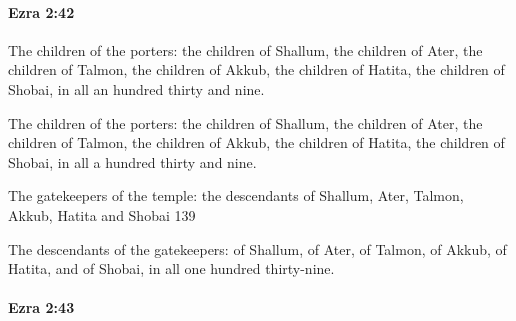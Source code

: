 		\paragraph{Ezra 2:42} %
			\label{EZRA-2-42}

			The children of the porters: the children of Shallum, the children of Ater, the children of Talmon, the children of Akkub, the children of Hatita, the children of Shobai, in all an hundred thirty and nine.

			\begin{versebox}
					\item[BHS] 
					\item[LXX] 
					\item[ASV] The children of the porters: the children of Shallum, the children of Ater, the children of Talmon, the children of Akkub, the children of Hatita, the children of Shobai, in all a hundred thirty and nine.
					\item[NIV] The gatekeepers of the temple: the descendants of Shallum, Ater, Talmon, Akkub, Hatita and Shobai 139
					\item[NRSV] The descendants of the gatekeepers: of Shallum, of Ater, of Talmon, of Akkub, of Hatita, and of Shobai, in all one hundred thirty-nine.
			\end{versebox}

		\paragraph{Ezra 2:43} %
			\label{EZRA-2-43}

